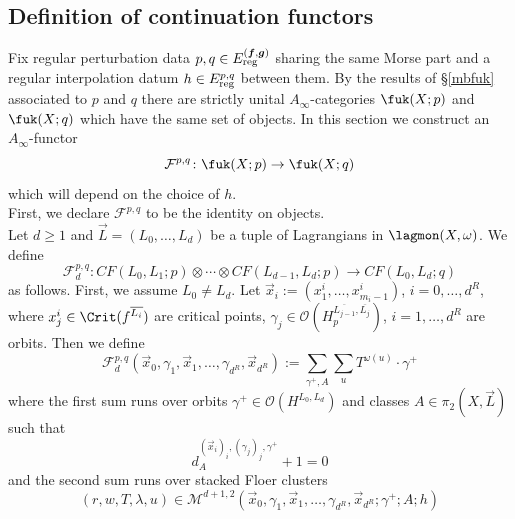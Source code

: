 	\subsection{Definition of continuation functors}
	Fix regular perturbation data $p,q\in E^{(\boldsymbol{f},\boldsymbol{g})}_\textnormal{reg}$ sharing the same Morse part and a regular interpolation datum $h\in E^{p,q}_\textnormal{reg}$ between them. By the results of \S \ref{mbfuk} associated to $p$ and $q$ there are strictly unital $A_\infty$-categories $\fuk(X;p)$ and $\fuk(X;q)$ which have the same set of objects. In this section we construct an $A_\infty$-functor $$\mathcal{F}^{p,q}\colon \fuk(X;p)\to \fuk(X;q)$$ which will depend on the choice of $h$.\\
	First, we declare $\mathcal{F}^{p,q}$ to be the identity on objects.\\
	Let $d\geq 1$ and $\vec{L}=(L_0,\ldots, L_d)$ be a tuple of Lagrangians in $\lagmon(X,\omega)$. We define $$\mathcal{F}^{p,q}_d\colon CF(L_0,L_1;p)\otimes \cdots\otimes CF(L_{d-1},L_d;p)\to CF(L_0,L_d;q)$$ as follows. First, we assume $L_0\neq L_d$. Let $\vec{x}_i:=(x^i_1,\ldots,x^i_{m_i-1})$, $i=0,\ldots,d^R$, where $x^i_j\in \Crit(f^{\overline{L_i}})$ are critical points, $\gamma_j\in \mathcal{O}(H^{\overline{L_{j-1}},\overline{L_j}}_p)$, $i=1,\ldots,d^R$ are orbits. Then we define $$\mathcal{F}^{p,q}_d(\vec{x}_0, \gamma_1, \vec{x}_1,\ldots,\gamma_{d^R}, \vec{x}_{d^R}):=\sum_{\gamma^+,A}\sum_u T^{\omega(u)}\cdot \gamma^+$$ where the first sum runs over orbits $\gamma^+\in \mathcal{O}(H^{L_0,L_d})$ and classes $A\in \pi_2(X,\vec{L})$ such that $$d_{A}^{(\vec{x}_i)_i, (\gamma_j)_j,\gamma^+}+1=0$$ and the second sum runs over stacked Floer clusters $$(r,w,T,\lambda,u)\in \mathcal{M}^{d+1,2}\left(\vec{x}_0, \gamma_1, \vec{x}_1,\ldots,\gamma_{d^R}, \vec{x}_{d^R}; \gamma^+;A;h\right)$$
	
